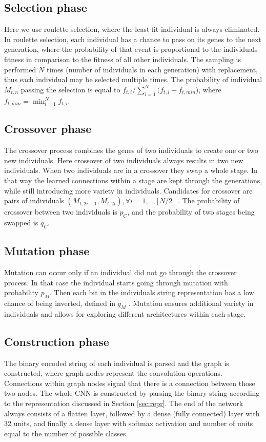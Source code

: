 \documentclass[eng]{simposium}
\begin{document}
\subsection{Selection phase} 
Here we use roulette selection, where the least fit individual is always eliminated. 
In roulette selection, each individual has a chance to pass on its genes to the next generation,  
where the probability of that event is proportional to the individuals fitness in comparison to the fitness of all other individuals. 
The sampling is performed $N$ times (number of individuals in each generation) with replacement, thus each individual may be selected multiple times. 
The probability of individual $M_{t,n}$ passing the selection is equal to $f_{t,i} / \sum_{i=1}^{N} (f_{t,i} - f_{t,min}$), where $f_{t, min} = \min_{i=1}^{N} {f_{t,i}}$. 

\subsection{Crossover phase} 

The crossover process combines the genes of two individuals to create one or two new individuals. 
Here crossover of two individuals always results in two new individuals. 
When two individuals are in a crossover they swap a whole stage. 
In that way the learned connections within a stage are kept through the generations, while still introducing more variety in individuals. 
Candidates for crossover are pairs of individuals $(M_{t,2i-1}, M_{t,2i}), \forall i=1,..,\lfloor N/2\rfloor $ \cite{4}. 
The probability of crossover between two individuals is $p_C$, and the probability of two stages being swapped is $q_C$. 

\subsection{Mutation phase} 
Mutation can occur only if an individual did not go through the crossover process. 
In that case the individual starts going through mutation with probability $p_M$. 
Then each bit in the individuals string representation has a low chance of being inverted, defined in $q_M$ \cite{4}. 
Mutation ensures additional variety in individuals and allows for exploring different architectures within each stage. 

\subsection{Construction phase} 
The binary encoded  string of each individual is parsed and the graph is constructed, where graph nodes represent the convolution operations. 
Connections within graph nodes signal that there is a connection between those two nodes. 
The whole CNN is constructed by parsing the binary string according to the representation discussed in Section \ref{sec:repr}.  
The end of the network always consists of a flatten layer, followed by a dense (fully connected) layer with 32 units, and finally a dense  
layer with softmax activation and number of units equal to the number of possible classes. 
\end{document}
